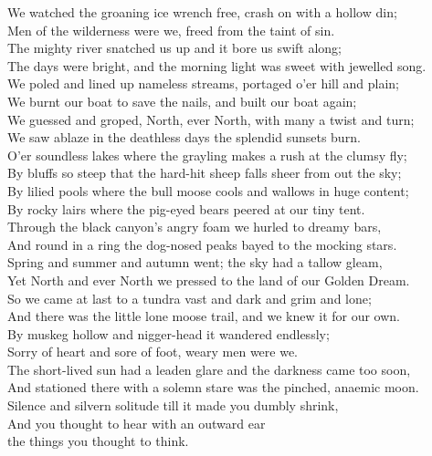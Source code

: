 \begin{poemblock}
We watched the groaning ice wrench free, crash on with a hollow din;\\
Men of the wilderness were we, freed from the taint of sin.\\
The mighty river snatched us up and it bore us swift along;\\
The days were bright, and the morning light was sweet with jewelled song.\\
We poled and lined up nameless streams, portaged o'er hill and plain;\\
We burnt our boat to save the nails, and built our boat again;\\
We guessed and groped, North, ever North, with many a twist and turn;\\
We saw ablaze in the deathless days the splendid sunsets burn.\\
O'er soundless lakes where the grayling makes a rush at the clumsy fly;\\
By bluffs so steep that the hard-hit sheep falls sheer from out the sky;\\
By lilied pools where the bull moose cools and wallows in huge content;\\
By rocky lairs where the pig-eyed bears peered at our tiny tent.\\
Through the black canyon's angry foam we hurled to dreamy bars,\\
And round in a ring the dog-nosed peaks bayed to the mocking stars.\\
Spring and summer and autumn went; the sky had a tallow gleam,\\
Yet North and ever North we pressed to the land of our Golden Dream.\\

So we came at last to a tundra vast and dark and grim and lone;\\
And there was the little lone moose trail, and we knew it for our own.\\
By muskeg hollow and nigger-head it wandered endlessly;\\
Sorry of heart and sore of foot, weary men were we.\\
The short-lived sun had a leaden glare and the darkness came too soon,\\
And stationed there with a solemn stare was the pinched, anaemic moon.\\
Silence and silvern solitude till it made you dumbly shrink,\\
And you thought to hear with an outward ear\\
\idt the things you thought to think.


\end{poemblock}
